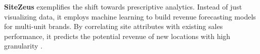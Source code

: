 \par \textbf{SiteZeus} exemplifies the shift towards prescriptive analytics. Instead of just visualizing data, it employs machine learning to build revenue forecasting models for multi-unit brands. By correlating site attributes with existing sales performance, it predicts the potential revenue of new locations with high granularity \citep{sitezeus_2024}.


